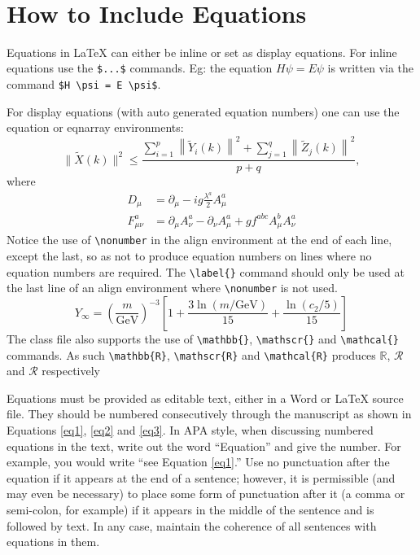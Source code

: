 \documentclass[12pt,a4paper]{article}
\newcommand{\subsubsubsection}[1]{%
  \vspace{\baselineskip}%
  \noindent\textbf{#1\\}\quad%
}
\begin{document}
\subsubsection{}\label{subsubsec2}

\subsubsubsection{}

\section{How to Include Equations}\label{sec4}

Equations in \LaTeX{} can either be inline or set as display equations. For
inline equations use the \verb+$...$+ commands. Eg: the equation
$H\psi = E \psi$ is written via the command \verb+$H \psi = E \psi$+.

For display equations (with auto generated equation numbers)
one can use the equation or eqnarray environments:
\begin{equation}
\|\tilde{X}(k)\|^2 \leq\frac{\sum\limits_{i=1}^{p}\left\|\tilde{Y}_i(k)\right\|^2+\sum\limits_{j=1}^{q}\left\|\tilde{Z}_j(k)\right\|^2 }{p+q},
\label{eq1}
\end{equation}
where
\begin{align}
D_\mu &=  \partial_\mu - ig \frac{\lambda^a}{2} A^a_\mu \nonumber \\
F^a_{\mu\nu} &= \partial_\mu A^a_\nu - \partial_\nu A^a_\mu + g f^{abc} A^b_\mu A^a_\nu
\label{eq2}
\end{align}
Notice the use of \verb+\nonumber+ in the align environment at the end
of each line, except the last, so as not to produce equation numbers on
lines where no equation numbers are required. The \verb+\label{}+ command
should only be used at the last line of an align environment where
\verb+\nonumber+ is not used.
\begin{equation}
Y_\infty = \left( \frac{m}{\textrm{GeV}} \right)^{-3}
    \left[ 1 + \frac{3 \ln(m/\textrm{GeV})}{15}
    + \frac{\ln(c_2/5)}{15} \right]
\label{eq3}
\end{equation}
The class file also supports the use of \verb+\mathbb{}+, \verb+\mathscr{}+ and
\verb+\mathcal{}+ commands. As such \verb+\mathbb{R}+, \verb+\mathscr{R}+
and \verb+\mathcal{R}+ produces $\mathbb{R}$, $\mathscr{R}$ and $\mathcal{R}$
respectively 

Equations must be provided as editable text, either in a Word or LaTeX source file. They should be numbered consecutively through the manuscript as shown in Equations \ref{eq1}, \ref{eq2} and \ref{eq3}. In APA style, when discussing numbered equations in the text, write out the word “Equation” and give the number. For example, you would write “see Equation \ref{eq1}.”
Use no punctuation after the equation if it appears at the end of a sentence; however, it is permissible (and may even be necessary) to place some form of punctuation after it (a comma or semi-colon, for example) if it appears in the middle of the sentence and is followed by text. In any case, maintain the coherence of all sentences with equations in them.
\end{document}
